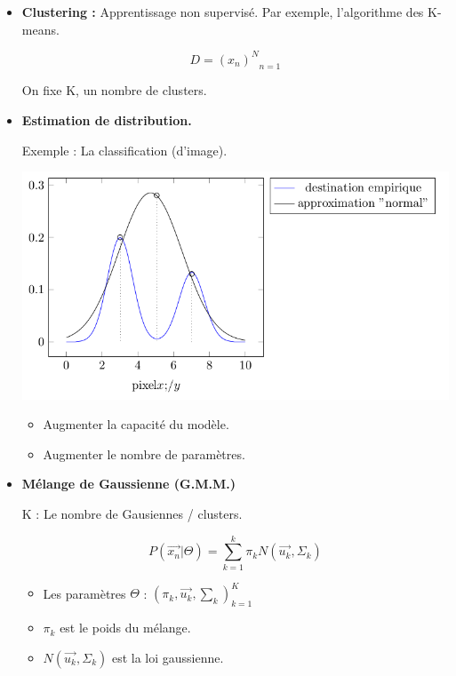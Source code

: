 \documentclass{article}
\begin{document}
\begin{itemize}

\item \textbf{Clustering :} Apprentissage non supervisé. Par exemple, l'algorithme des K-means.

\[ D = {(x_n)^N}_{n=1}  \]

On fixe K, un nombre de clusters.

\item \textbf{Estimation de distribution.}

Exemple : La classification (d'image).

\includegraphics[scale=0.4]{schema4.png}

\begin{itemize}
\item Augmenter la capacité du modèle.
\item Augmenter le nombre de paramètres.
\end{itemize}

\item \textbf{Mélange de Gaussienne (G.M.M.)}

K : Le nombre de Gausiennes / clusters.

\[ P(\vec{x_n} | \Theta) = \sum_{k=1}^k \pi_k N(\vec{u_k}, \Sigma_k) \]

\begin{itemize}

\item Les paramètres $\Theta$ : $(\pi_k, \vec{u_k}, \sum_k)_{k=1}^K$

\item $\pi_k$ est le poids du mélange.

\item $N(\vec{u_k}, \Sigma_k)$ est la loi gaussienne.

\end{itemize}

\end{itemize}
\end{document}
